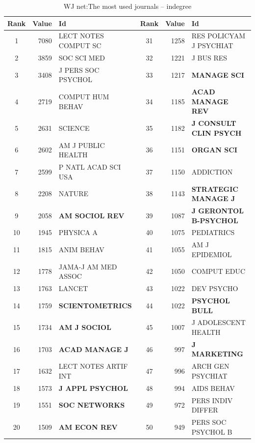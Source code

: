 \documentclass[11pt]{article} %
\begin{document}
\begin{table}
\caption{WJ net:\label{jourind}The most used journals -- indegree}\medskip
\small
\renewcommand{\arraystretch}{0.95}
\begin{tabular}{c|r|l||c|r|l}
Rank&   	Value&   	Id&   	Rank&   	Value&   	Id \\ \hline
1&   	7080&   	LECT NOTES COMPUT SC&   	31&   	1258&   	RES POLICY{AM J PSYCHIAT}\\   
2&   	3859&   	SOC SCI MED&   	32&   	1221&   	J BUS RES\\   
3&   	3408&   	J PERS SOC PSYCHOL&   	33&   	1217&   	\textbf{MANAGE SCI}\\   
4&   	2719&   	COMPUT HUM BEHAV&   	34&   	1185&   	\textbf{ACAD MANAGE REV}\\   
5&   	2631&   	SCIENCE&   	35&   	1182&   	\textbf{J CONSULT CLIN PSYCH}\\   
6&   	2602&   	AM J PUBLIC HEALTH&   	36&   	1151&  \textbf {ORGAN SCI}\\   
7&   	2599&   	P NATL ACAD SCI USA&   	37&   	1150&   	ADDICTION\\   
8&   	2208&   	NATURE&   	38&   	1143&   	\textbf{STRATEGIC MANAGE J}\\   
9&   	2058&   	\textbf{AM SOCIOL REV}&   	39&   	1087&   	\textbf{J GERONTOL B-PSYCHOL}\\   
10&   	1945&   	PHYSICA A&   	40&   	1075&   	PEDIATRICS\\   
11&   	1815&   	ANIM BEHAV&   	41&   	1055&   	AM J EPIDEMIOL\\   
12&   	1778&   	JAMA-J AM MED ASSOC&   	42&   	1050&   	COMPUT EDUC\\   
13&   	1763&   	LANCET&   	43&   	1022&   	DEV PSYCHO\\   
14&   	1759&   	\textbf{SCIENTOMETRICS}&   	44&   	1022&   	\textbf{PSYCHOL BULL}\\   
15&   	1734&   	\textbf{AM J SOCIOL}&   	45&   	1007&   	J ADOLESCENT HEALTH\\   
16&   	1703&   	\textbf{ACAD MANAGE J}&   	46&   	997&   	\textbf{J MARKETING}\\   
17&   	1632&   	LECT NOTES ARTIF INT&   	47&   	996&   	ARCH GEN PSYCHIAT\\   
18&   	1573&   	\textbf{J APPL PSYCHOL}&   	48&   	994&   	AIDS BEHAV\\   
19&   	1551&   	\textbf{SOC NETWORKS}&   	49&   	972&   	PERS INDIV DIFFER\\   
20&   	1509&   	\textbf{AM ECON REV}&   	50&   	949&   	PERS SOC PSYCHOL B\\   

\end{tabular}
\end{table}
\end{document}
